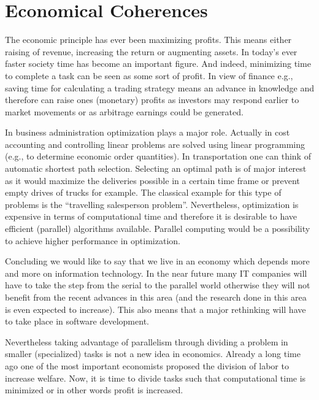 \section{Economical Coherences}

The economic principle has ever been maximizing
profits. This means either raising of revenue, increasing the return
or augmenting assets. In today's ever faster society time has become
an important figure. And indeed, minimizing time to complete a task
can be seen as some sort of profit. In view of finance e.g., saving time for
calculating a trading strategy means an advance in knowledge and
therefore can raise ones (monetary) profits as investors may respond
earlier to market movements or as arbitrage earnings could be
generated.

In business administration optimization plays a major role. Actually in
cost accounting and controlling linear problems are solved using
linear programming (e.g., to determine economic order quantities). In
transportation one can think of automatic shortest path
selection. Selecting an optimal path is of major interest as it would
maximize the deliveries possible in a certain time frame or prevent
empty drives of trucks for example. The classical example for this
type of problems is the ``travelling salesperson
problem''. Nevertheless, optimization is expensive in terms of
computational time and therefore it is desirable to have efficient
(parallel) algorithms available. Parallel computing would be a
possibility to achieve higher performance in optimization.


Concluding we would like to say that we live in an economy which
depends more and more on information technology. In the near future
many IT companies will have to take the step from the serial to 
the parallel world otherwise they will not benefit from the recent
advances in this area (and the research done in this area is even expected
to increase). This also means that a major rethinking will
have to take place in software development.

Nevertheless taking advantage of parallelism through dividing a
problem in smaller (specialized) tasks is not a new idea in
economics. Already a long time ago one of the most important
economists \cite{smith:iin} 
proposed the division of labor to increase welfare. Now, it is time
to divide tasks such that computational time is minimized or in other
words profit is increased.

